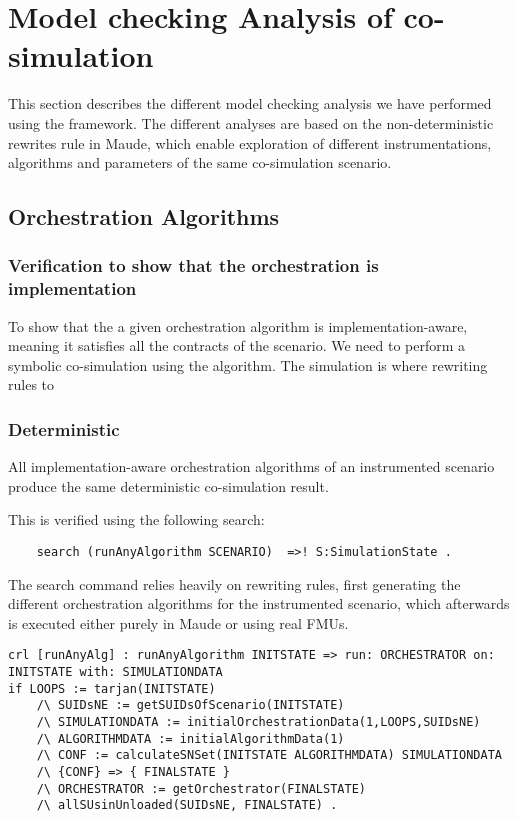 \section{Model checking Analysis of co-simulation}
This section describes the different model checking analysis we have performed using the framework.
The different analyses are based on the non-deterministic rewrites rule in Maude, which enable exploration of different instrumentations, algorithms and parameters of the same co-simulation scenario.

\subsection{Orchestration Algorithms}

\subsubsection{Verification to show that the orchestration is implementation}
To show that the a given orchestration algorithm is implementation-aware, meaning it satisfies all the contracts of the scenario.
We need to perform a symbolic co-simulation using the algorithm. The simulation is 
 where rewriting rules to 

\subsubsection{Deterministic }

\begin{lemma}
    All implementation-aware orchestration algorithms of an instrumented scenario produce the same deterministic co-simulation result.
\end{lemma}

This is verified using the following search:
\begin{lstlisting}
    search (runAnyAlgorithm SCENARIO)  =>! S:SimulationState .
\end{lstlisting}

The search command relies heavily on rewriting rules, first generating the different orchestration algorithms for the instrumented scenario, which afterwards is executed either purely in Maude or using real FMUs.  

\begin{lstlisting}
crl [runAnyAlg] : runAnyAlgorithm INITSTATE => run: ORCHESTRATOR on: INITSTATE with: SIMULATIONDATA
if LOOPS := tarjan(INITSTATE)
    /\ SUIDsNE := getSUIDsOfScenario(INITSTATE)
    /\ SIMULATIONDATA := initialOrchestrationData(1,LOOPS,SUIDsNE)
    /\ ALGORITHMDATA := initialAlgorithmData(1)
    /\ CONF := calculateSNSet(INITSTATE ALGORITHMDATA) SIMULATIONDATA 
    /\ {CONF} => { FINALSTATE } 
    /\ ORCHESTRATOR := getOrchestrator(FINALSTATE)
    /\ allSUsinUnloaded(SUIDsNE, FINALSTATE) .
\end{lstlisting}

